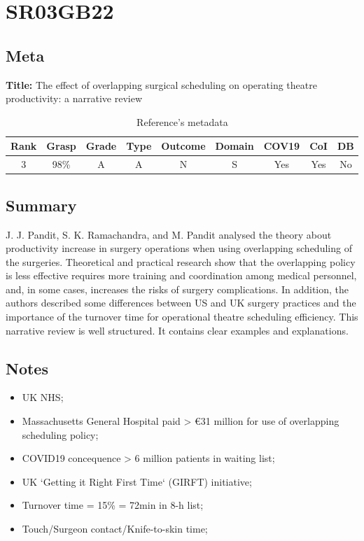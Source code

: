 \section{ SR03GB22 }


\subsection{Meta}

    \textbf{Title:}
    The effect of overlapping surgical scheduling on operating theatre productivity: a narrative review

    \begin{table}[H]
        \centering
        \begin{tabular}{|c|c|c|c|c|c|c|c|c|}
            \hline
                \textbf{Rank} & \textbf{Grasp} & \textbf{Grade} & \textbf{Type} & \textbf{Outcome} & \textbf{Domain} & \textbf{COV19} & \textbf{CoI} & \textbf{DB} \\
            \hline
                3 & 98\% & A & A & N & S & Yes & Yes & No \\
            \hline
        \end{tabular}
        \caption{Reference's metadata}
        \label{tab:SR03GB22}
    \end{table}

\subsection{Summary}
    J. J. Pandit, S. K. Ramachandra, and M. Pandit \cite{x333} analysed the theory about productivity increase in surgery operations when using overlapping scheduling of the surgeries. Theoretical and practical research show that the overlapping policy is less effective requires more training and coordination among medical personnel, and, in some cases, increases the risks of surgery complications. In addition, the authors described some differences between US and UK surgery practices and the importance of the turnover time for operational theatre scheduling efficiency. This narrative review is well structured. It contains clear examples and explanations.
    

\subsection{Notes}
    \begin{itemize}
        \item UK NHS;
        \item Massachusetts General Hospital paid > €31 million for use of overlapping scheduling policy;
        \item COVID19 concequence > 6 million patients in waiting list;
        \item UK `Getting it Right First Time` (GIRFT) initiative;
        \item Turnover time = 15\% = 72min in 8-h list;
        \item Touch/Surgeon contact/Knife-to-skin time;
    \end{itemize}


